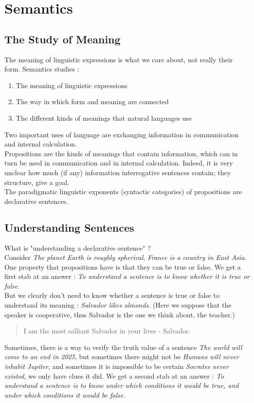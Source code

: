 \documentclass{cours}
\begin{document}
\section{Semantics}
\subsection{The Study of Meaning}
The meaning of linguistic expressions is what we care about, not really their form. Semantics studies : 
\begin{enumerate}
    \item The meaning of linguistic expressions
    \item The way in which form and meaning are connected
    \item The different kinds of meanings that natural languages use
\end{enumerate}
Two important uses of language are exchanging information in communication and internal calculation.\\
Propositions are the kinds of meanings that contain information, which can in turn be used in communication and in internal calculation. Indeed, it is very unclear how much (if any) information interrogative sentences contain; they structure, give a goal. \\
The paradigmatic linguistic exponents (syntactic categories) of propositions are declarative sentences.

\subsection{Understanding Sentences}
What is "understanding a declarative sentence" ?\\

Consider \textsl{The planet Earth is roughly spherical}, \textsl{France is a country in East Asia}. One property that propositions have is that they can be true or false. We get a first stab at an answer : \textit{To understand a sentence is to know whether it is true or false.}\\

But we clearly don't need to know whether a sentence is true or false to understand its meaning : \textit{Salvador likes almonds}. (Here we suppose that the speaker is cooperative, thus Salvador is the one we think about, the teacher.)
\begin{quotation}
    I am the most salliant Salvador in your lives - Salvador.
\end{quotation}
Sometimes, there is a way to verify the truth value of a sentence \textsl{The world will come to an end in 2025}, but sometimes there might not be \textsl{Humans will never inhabit Jupiter}, and sometimes it is impossible to be certain \textsl{Socrates never existed}, we only have clues it did. We get a second stab at an answer : \textit{To understand a sentence is to know under which conditions it would be true, and under which conditions it would be false.}\\
\end{document}
